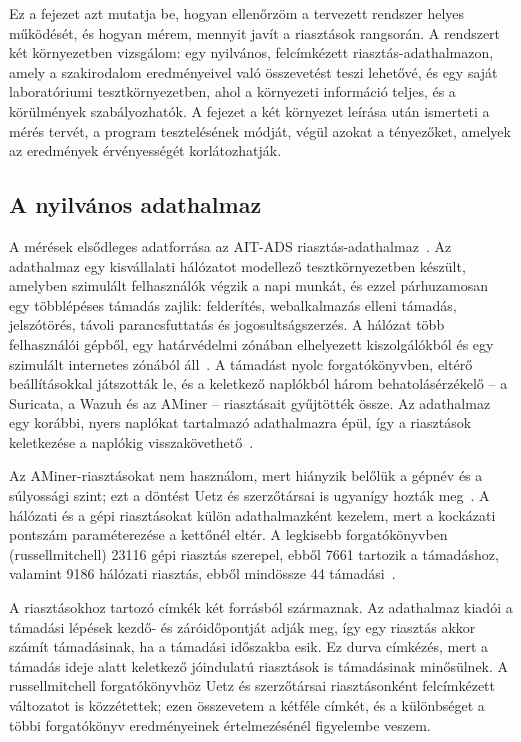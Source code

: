 Ez a fejezet azt mutatja be, hogyan ellenőrzöm a tervezett rendszer helyes működését, és hogyan mérem, mennyit javít a riasztások rangsorán. A rendszert két környezetben vizsgálom: egy nyilvános, felcímkézett riasztás-adathalmazon, amely a szakirodalom eredményeivel való összevetést teszi lehetővé, és egy saját laboratóriumi tesztkörnyezetben, ahol a környezeti információ teljes, és a körülmények szabályozhatók. A fejezet a két környezet leírása után ismerteti a mérés tervét, a program tesztelésének módját, végül azokat a tényezőket, amelyek az eredmények érvényességét korlátozhatják.

\subsection{A nyilvános adathalmaz}\label{sec:aitads}
A mérések elsődleges adatforrása az AIT-ADS riasztás-adathalmaz~\cite{landauer2024aitads}. Az adathalmaz egy kisvállalati hálózatot modellező tesztkörnyezetben készült, amelyben szimulált felhasználók végzik a napi munkát, és ezzel párhuzamosan egy többlépéses támadás zajlik: felderítés, webalkalmazás elleni támadás, jelszótörés, távoli parancsfuttatás és jogosultságszerzés. A hálózat több felhasználói gépből, egy határvédelmi zónában elhelyezett kiszolgálókból és egy szimulált internetes zónából áll~\cite{uetz2026rba}. A támadást nyolc forgatókönyvben, eltérő beállításokkal játszották le, és a keletkező naplókból három behatolásérzékelő -- a Suricata, a Wazuh és az AMiner -- riasztásait gyűjtötték össze. Az adathalmaz egy korábbi, nyers naplókat tartalmazó adathalmazra épül, így a riasztások keletkezése a naplókig visszakövethető~\cite{landauer2023aitlds}.

Az AMiner-riasztásokat nem használom, mert hiányzik belőlük a gépnév és a súlyossági szint; ezt a döntést Uetz és szerzőtársai is ugyanígy hozták meg~\cite{uetz2026rba}. A hálózati és a gépi riasztásokat külön adathalmazként kezelem, mert a kockázati pontszám
paraméterezése a kettőnél eltér. A legkisebb forgatókönyvben (russellmitchell) 23116 gépi riasztás szerepel, ebből 7661 tartozik a támadáshoz, valamint 9186 hálózati riasztás, ebből mindössze 44 támadási~\cite{uetz2026rba}.

A riasztásokhoz tartozó címkék két forrásból származnak. Az adathalmaz kiadói a támadási lépések kezdő- és záróidőpontját adják meg, így egy riasztás akkor számít támadásinak, ha a támadási időszakba esik. Ez durva címkézés, mert a támadás ideje alatt keletkező jóindulatú riasztások is támadásinak minősülnek. A russellmitchell forgatókönyvhöz Uetz és szerzőtársai riasztásonként felcímkézett változatot is közzétettek; ezen összevetem a kétféle címkét, és a különbséget a többi forgatókönyv eredményeinek értelmezésénél figyelembe veszem.

